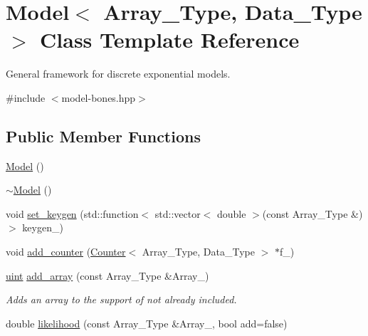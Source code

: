 \hypertarget{class_model}{}\section{Model$<$ Array\+\_\+\+Type, Data\+\_\+\+Type $>$ Class Template Reference}
\label{class_model}


General framework for discrete exponential models.  




{\ttfamily \#include $<$model-\/bones.\+hpp$>$}

\subsection*{Public Member Functions}
\begin{DoxyCompactItemize}
\item 
\hyperlink{class_model_a38122122aa4eb799b90ed1ee49b9410c}{Model} ()
\item 
\hyperlink{class_model_aaed0a5937479c213e620bf8095ddea5d}{$\sim$\+Model} ()
\item 
void \hyperlink{class_model_afa4736153fa419e1f141839eda735dfe}{set\+\_\+keygen} (std\+::function$<$ std\+::vector$<$ double $>$(const Array\+\_\+\+Type \&)$>$ keygen\+\_\+)
\item 
void \hyperlink{class_model_a4cf4d6fc6cf43d598fa6195c25f5cca5}{add\+\_\+counter} (\hyperlink{class_counter}{Counter}$<$ Array\+\_\+\+Type, Data\+\_\+\+Type $>$ $\ast$f\+\_\+)
\item 
\hyperlink{typedefs_8hpp_a91ad9478d81a7aaf2593e8d9c3d06a14}{uint} \hyperlink{class_model_a9f66c7c39acb51cd49658ebd1c5999d4}{add\+\_\+array} (const Array\+\_\+\+Type \&Array\+\_\+)
\begin{DoxyCompactList}\small\item\em Adds an array to the support of not already included. \end{DoxyCompactList}\item 
double \hyperlink{class_model_a9981974cc551be9393c73a0c423a92c0}{likelihood} (const Array\+\_\+\+Type \&Array\+\_\+, bool add=false)
\end{DoxyCompactItemize}
